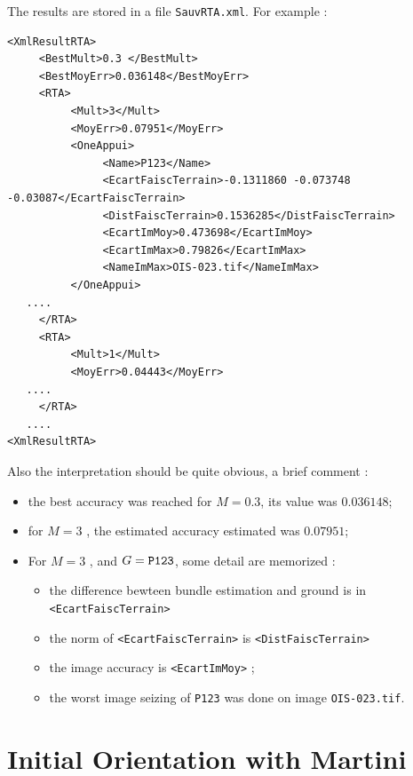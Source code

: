 The results are stored in a file {\tt SauvRTA.xml}. For example :

\begin{verbatim}
<XmlResultRTA>
     <BestMult>0.3 </BestMult>
     <BestMoyErr>0.036148</BestMoyErr>
     <RTA>
          <Mult>3</Mult>
          <MoyErr>0.07951</MoyErr>
          <OneAppui>
               <Name>P123</Name>
               <EcartFaiscTerrain>-0.1311860 -0.073748 -0.03087</EcartFaiscTerrain>
               <DistFaiscTerrain>0.1536285</DistFaiscTerrain>
               <EcartImMoy>0.473698</EcartImMoy>
               <EcartImMax>0.79826</EcartImMax>
               <NameImMax>OIS-023.tif</NameImMax>
          </OneAppui>
   ....
     </RTA>
     <RTA>
          <Mult>1</Mult>
          <MoyErr>0.04443</MoyErr>
   ....
     </RTA>
   ....
<XmlResultRTA>
\end{verbatim}

Also the interpretation should be quite obvious, a brief comment :

\begin{itemize}
   \item  the best accuracy was reached for $M=0.3$, its value was $0.036148$;

   \item for  $M=3$ , the estimated accuracy estimated was $0.07951$;

   \item For $M=3$ , and  $G={\tt P123}$, some detail are memorized :
   \begin{itemize}
       \item the  difference bewteen bundle estimation and ground is in {\tt <EcartFaiscTerrain>}
       \item the  norm of  {\tt <EcartFaiscTerrain>} is {\tt <DistFaiscTerrain>}
       \item the   image accuracy  is  {\tt  <EcartImMoy>} ;
       \item the   worst image seizing of {\tt P123} was done on image {\tt OIS-023.tif}.
   \end{itemize}
  
\end{itemize}


\section{Initial Orientation with Martini}

